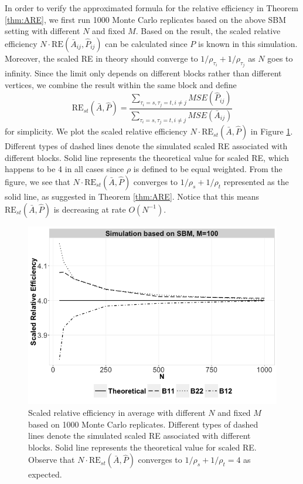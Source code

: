\documentclass[a4paper]{article}
\begin{document}
In order to verify the approximated formula for the relative efficiency in Theorem \ref{thm:ARE}, we first run 1000 Monte Carlo replicates based on the above SBM setting with different $N$ and fixed $M$. Based on the result, the scaled relative efficiency $N \cdot \mathrm{RE}(\bar{A}_{ij}, \hat{P}_{ij})$ can be calculated since $P$ is known in this simulation. Moreover, the scaled RE in theory should converge to $1/\rho_{\tau_i}+1/\rho_{\tau_j}$ as $N$ goes to infinity. Since the limit only depends on different blocks rather than different vertices, we combine the result within the same block and define
\[
	\mathrm{RE}_{st}(\bar{A},\hat{P}) = \frac{\sum_{\tau_i=s,\tau_j=t,i \ne j} MSE(\hat{P}_{ij})}{\sum_{\tau_i=s,\tau_j=t,i \ne j} MSE(\bar{A}_{ij})}
\]
for simplicity.
We plot the scaled relative efficiency $N \cdot \mathrm{RE}_{st}(\bar{A},\hat{P})$ in Figure \ref{fig:RE}. Different types of dashed lines denote the simulated scaled RE associated with different blocks. Solid line represents the theoretical value for scaled RE, which happens to be 4 in all cases since $\rho$ is defined to be equal weighted. From the figure, we see that $N \cdot \mathrm{RE}_{st}(\bar{A}, \hat{P})$ converges to $1/\rho_s + 1/\rho_t$ represented as the solid line, as suggested in Theorem \ref{thm:ARE}. Notice that this means $\mathrm{RE}_{st}(\bar{A}, \hat{P})$ is decreasing at rate $O(N^{-1})$.

\begin{figure}[!htb]
	\centering
	\includegraphics[width=1\textwidth]{RE.png}
	\caption{Scaled relative efficiency in average with different $N$ and fixed $M$ based on 1000 Monte Carlo replicates. Different types of dashed lines denote the simulated scaled RE associated with different blocks. Solid line represents the theoretical value for scaled RE. Observe that $N \cdot \mathrm{RE}_{st}(\bar{A}, \hat{P})$ converges to $1/\rho_s + 1/\rho_t = 4$ as expected.}
	\label{fig:RE}
\end{figure}
\end{document}
